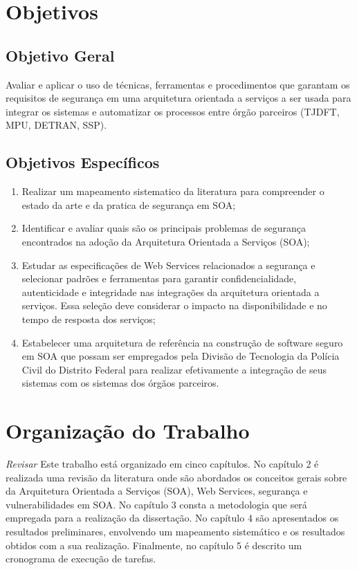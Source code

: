 \section{Objetivos}\label{sec:Obj}
\subsection{Objetivo Geral}

Avaliar e aplicar o uso de técnicas, ferramentas  e procedimentos que garantam os requisitos de segurança em uma arquitetura orientada a serviços a ser usada para integrar os sistemas e automatizar os processos entre órgão parceiros (TJDFT, MPU, DETRAN, SSP).

\subsection{Objetivos Espec\'ificos}

\begin{enumerate}[a )]
	\item Realizar um mapeamento sistematico da literatura para compreender o estado da arte e da pratica de segurança em SOA;

	\item Identificar e avaliar quais são os principais problemas de segurança encontrados na adoção da Arquitetura Orientada a Serviços (SOA);

	\item Estudar as especificações de Web Services relacionados a segurança e selecionar padrões e ferramentas para garantir confidencialidade, autenticidade e integridade nas integrações da arquitetura orientada a serviços. Essa seleção deve considerar o impacto na disponibilidade e no tempo de resposta dos serviços;

    \item Estabelecer uma arquitetura de referência na construção de software seguro em  SOA que possam ser empregados pela Divisão de Tecnologia da Polícia Civil do Distrito Federal para realizar efetivamente a integração de seus sistemas com os sistemas dos órgãos parceiros.

\end{enumerate}

\section{Organização do Trabalho}

\emph{Revisar}
Este trabalho está organizado em cinco capítulos. No capítulo 2 é realizada uma revisão da literatura onde são abordados os conceitos gerais sobre da Arquitetura Orientada a Serviços (SOA), Web Services, segurança e vulnerabilidades em SOA. No capítulo 3 consta a metodologia que será empregada para a realização da dissertação. No capítulo 4 são apresentados os resultados preliminares, envolvendo um mapeamento sistemático e os resultados obtidos com a sua realização. Finalmente, no capítulo 5 é descrito um cronograma de execução de tarefas. 